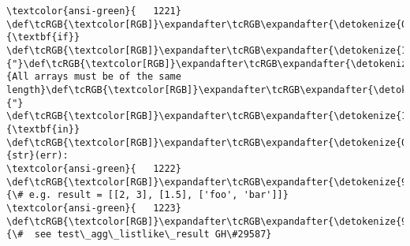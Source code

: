 \documentclass[11pt]{article}
\begin{document}
\begin{Verbatim}[commandchars=\\\{\}, frame=single, framerule=2mm, rulecolor=\color{outerrorbackground}]
\textcolor{ansi-green}{   1221}     \def\tcRGB{\textcolor[RGB]}\expandafter\tcRGB\expandafter{\detokenize{0,135,0}}{\textbf{if}} \def\tcRGB{\textcolor[RGB]}\expandafter\tcRGB\expandafter{\detokenize{175,0,0}}{"}\def\tcRGB{\textcolor[RGB]}\expandafter\tcRGB\expandafter{\detokenize{175,0,0}}{All arrays must be of the same length}\def\tcRGB{\textcolor[RGB]}\expandafter\tcRGB\expandafter{\detokenize{175,0,0}}{"} \def\tcRGB{\textcolor[RGB]}\expandafter\tcRGB\expandafter{\detokenize{175,0,255}}{\textbf{in}} \def\tcRGB{\textcolor[RGB]}\expandafter\tcRGB\expandafter{\detokenize{0,135,0}}{str}(err):
\textcolor{ansi-green}{   1222}         \def\tcRGB{\textcolor[RGB]}\expandafter\tcRGB\expandafter{\detokenize{95,135,135}}{\# e.g. result = [[2, 3], [1.5], ['foo', 'bar']]}
\textcolor{ansi-green}{   1223}         \def\tcRGB{\textcolor[RGB]}\expandafter\tcRGB\expandafter{\detokenize{95,135,135}}{\#  see test\_agg\_listlike\_result GH\#29587}


\end{Verbatim}
\end{document}
